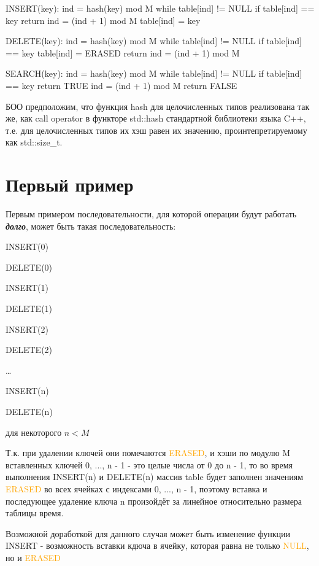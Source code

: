 \documentclass{report}
\begin{document}
\begin{cppcode}
INSERT(key):
    ind = hash(key) mod M
    while table[ind] != NULL
        if table[ind] == key
            return
        ind = (ind + 1) mod M
    table[ind] = key
\end{cppcode}
\begin{cppcode}
DELETE(key):
    ind = hash(key) mod M
    while table[ind] != NULL
        if table[ind] == key
            table[ind] = ERASED
            return
        ind = (ind + 1) mod M
\end{cppcode}
\begin{cppcode}
SEARCH(key):
    ind = hash(key) mod M
    while table[ind] != NULL
        if table[ind] == key
            return TRUE 
        ind = (ind + 1) mod M
    return FALSE
\end{cppcode}

БОО предположим, что функция hash для целочисленных типов реализована так же, как
call operator в функторе std::hash стандартной библиотеки языка C++, т.е. для целочисленных типов
их хэш равен их значению, проинтепретируемому как std::size\_t.

\section*{Первый пример}

Первым примером последовательности, для которой операции будут работать \textbf{\textit{долго}},
может быть такая последовательность:

INSERT(0)

DELETE(0)

INSERT(1)

DELETE(1)

INSERT(2)

DELETE(2)

\dots

INSERT(n)

DELETE(n)

для некоторого $ n < M $

Т.к. при удалении ключей они помечаются \textcolor{orange}{ERASED}, 
и хэши по модулю M вставленных ключей 0, ..., n - 1 - это целые числа 
от 0 до n - 1, то во время выполнения INSERT(n) и DELETE(n) массив table 
будет заполнен значениям \textcolor{orange}{ERASED} во всех ячейках с 
индексами 0, ..., n - 1, поэтому вставка и последующее удаление ключа 
n произойдёт за линейное относительно размера таблицы время.

Возможной доработкой для данного случая может быть изменение функции 
INSERT - возможность вставки кдюча в ячейку, которая равна не только 
\textcolor{orange}{NULL}, но и \textcolor{orange}{ERASED}
\end{document}
